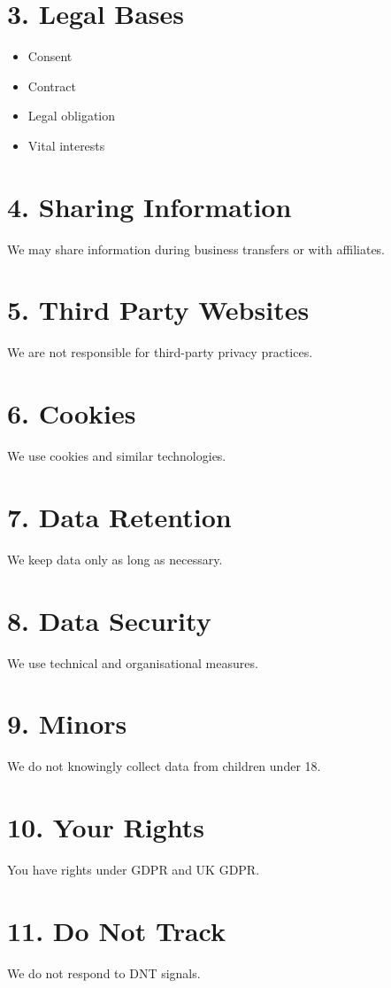 \documentclass[11pt, a4paper]{report}
\begin{document}
\begin{itemize}
\section*{3. Legal Bases}
\begin{itemize}
	\item Consent
	\item Contract
	\item Legal obligation
	\item Vital interests
\end{itemize}

\section*{4. Sharing Information}
We may share information during business transfers or with affiliates.

\section*{5. Third Party Websites}
We are not responsible for third-party privacy practices.

\section*{6. Cookies}
We use cookies and similar technologies.

\section*{7. Data Retention}
We keep data only as long as necessary.

\section*{8. Data Security}
We use technical and organisational measures.

\section*{9. Minors}
We do not knowingly collect data from children under 18.

\section*{10. Your Rights}
You have rights under GDPR and UK GDPR.

\section*{11. Do Not Track}
We do not respond to DNT signals.


\end{itemize}
\end{document}
